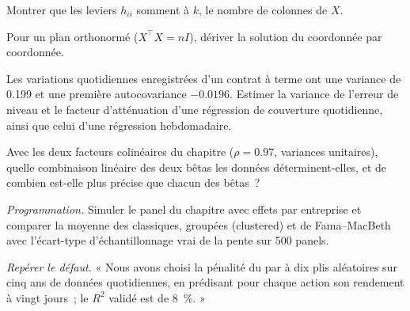 \begin{exercise}[$\star$]\label{exo:qm:linear-models-under-stress:3}
Montrer que les leviers $h_{ii}$ somment à $k$, le nombre de colonnes de $X$.
\end{exercise}

\begin{exercise}[$\star\star$]\label{exo:qm:linear-models-under-stress:4}
Pour un plan orthonormé ($X^\top X = nI$), dériver la solution du  coordonnée par coordonnée.
\end{exercise}

\begin{exercise}[$\star\star$]\label{exo:qm:linear-models-under-stress:5}
Les variations quotidiennes enregistrées d'un contrat à terme ont une variance de 0.199 et une première autocovariance $-0.0196$. Estimer la variance de l'erreur de niveau et le
facteur d'atténuation d'une régression de couverture quotidienne, ainsi que celui d'une régression hebdomadaire.
\end{exercise}

\begin{exercise}[$\star\star$]\label{exo:qm:linear-models-under-stress:6}
Avec les deux facteurs colinéaires du chapitre ($\rho = 0.97$, variances unitaires), quelle combinaison linéaire des deux bêtas les données déterminent-elles,
et de combien est-elle plus précise que chacun des bêtas~?
\end{exercise}

\begin{exercise}[$\star\star\star$]\label{exo:qm:linear-models-under-stress:7}
\emph{Programmation.} Simuler le panel du chapitre avec effets par entreprise et comparer la moyenne des  classiques, groupées (clustered) et de Fama--MacBeth avec
l'écart-type d'échantillonnage vrai de la pente sur 500 panels.
\end{exercise}

\begin{exercise}[$\star\star\star$]\label{exo:qm:linear-models-under-stress:8}
\emph{Repérer le défaut.} « Nous avons choisi la pénalité du  par  à dix plis aléatoires sur cinq ans de données quotidiennes, en prédisant pour chaque
action son rendement à vingt jours~; le $R^2$ validé est de 8~\%. »
\end{exercise}

